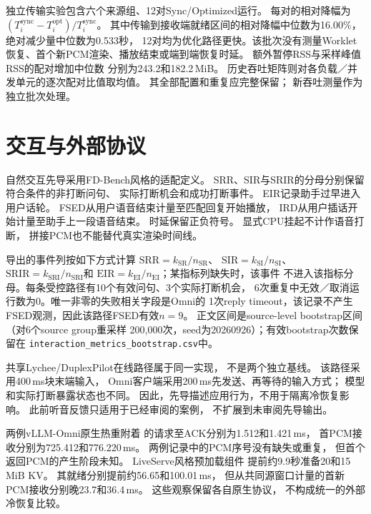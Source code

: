 独立传输实验包含六个来源组、12对Sync/Optimized运行。
每对的相对降幅为
$(T_i^{\mathrm{sync}}-T_i^{\mathrm{opt}})/T_i^{\mathrm{sync}}$。
其中传输到接收端就绪区间的相对降幅中位数为16.00\%，绝对减少量中位数为0.533秒，
12对均为优化路径更快。该批次没有测量Worklet恢复、首个新PCM渲染、播放结束或端到端恢复时延。
额外暂停RSS与采样峰值RSS的配对增加中位数
分别为243.2和182.2\,MiB。
历史吞吐矩阵则对各负载／并发单元的逐次配对比值取均值。
其全部配置和重复应完整保留；
新吞吐测量作为独立批次处理。


\section{交互与外部协议}
\label{app:interaction}

自然交互先导采用FD-Bench风格的适配定义\citep{fdbench2025}。
SRR、SIR与SRIR的分母分别保留符合条件的非打断问句、
实际打断机会和成功打断事件。
EIR记录助手过早进入用户话轮。
FSED从用户语音结束计量至匹配回复开始播放，
IRD从用户插话开始计量至助手上一段语音结束。
时延保留正负符号。
显式CPU挂起不计作语音打断，
拼接PCM也不能替代真实渲染时间线。

导出的事件列按如下方式计算
$\mathrm{SRR}=k_{\mathrm{SR}}/n_{\mathrm{SR}}$、
$\mathrm{SIR}=k_{\mathrm{SI}}/n_{\mathrm{SI}}$、
$\mathrm{SRIR}=k_{\mathrm{SRI}}/n_{\mathrm{SRI}}$和
$\mathrm{EIR}=k_{\mathrm{EI}}/n_{\mathrm{EI}}$；某指标列缺失时，该事件
不进入该指标分母。每条受控路径有10个有效问句、3个实际打断机会，
6次重复中无效／取消运行数为0。唯一非零的失败相关字段是Omni的
1次reply timeout，该记录不产生FSED观测，因此该路径FSED有效$n=9$。
正文区间是source-level bootstrap区间（对6个source group重采样
200,000次，seed为20260926）；有效bootstrap次数保留在
\texttt{interaction\_metrics\_bootstrap.csv}中。

共享Lychee/DuplexPilot在线路径属于同一实现，
不是两个独立基线。
该路径采用400\,ms块末端输入，
Omni客户端采用200\,ms先发送、再等待的输入方式；
模型和实际打断暴露状态也不同。
因此，先导描述应用行为，不用于隔离冷恢复影响。
此前听音反馈只适用于已经审阅的案例，
不扩展到未审阅先导输出。

两例vLLM-Omni原生热重附着\citep{omnidoc}
的请求至ACK分别为1.512和1.421\,ms，
首PCM接收分别为725.412和776.220\,ms。
两例记录中的PCM序号没有缺失或重复，
但首个返回PCM的产生阶段未知。
LiveServe风格预加载组件\citep{liveserve2026}
提前约9.9秒准备20和15\,MiB KV。
其就绪分别提前约56.65和100.01\,ms，
但从共同源窗口计量的首新PCM接收分别晚23.7和36.4\,ms。
这些观察保留各自原生协议，
不构成统一的外部冷恢复比较。


